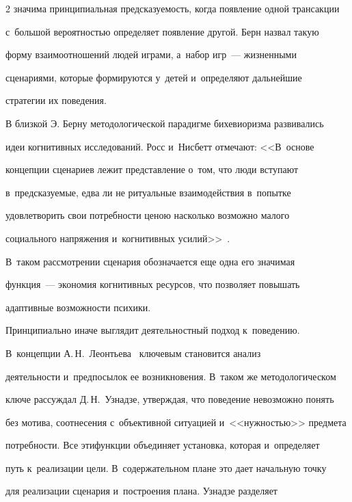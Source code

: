 \begin{multicols}{2}
значима принципиальная предсказуемость, когда появление одной трансакции 

с~большой вероятностью определяет появление другой. Берн назвал такую 

форму взаимоотношений людей играми, а~набор игр~--- жизненными 

сценариями, которые формируются у~детей и~определяют дальнейшие 

стратегии их поведения. 

  

  В близкой Э. Берну методологической парадигме бихевиоризма развивались 

идеи когнитивных исследований. Росс и~Нисбетт отмечают: <<В~основе 

концепции сценариев лежит представление о~том, что люди вступают 

в~пред\-ска\-зу\-емые, едва ли не ритуальные взаимодействия в~попытке 

удовлетворить свои по\-треб\-но\-сти ценою насколько воз\-мож\-но малого 

социального напряжения и~когнитивных усилий>>~\cite[с.~145]{5-sm}. 

В~таком рассмотрении сценария обозначается еще одна его значимая 

функция~--- экономия когнитивных ресурсов, что позволяет повышать 

адаптивные возможности пси\-хики.

{ %



}

  

  Принципиально иначе выглядит деятельностный подход к~поведению. 

В~концепции А.\,Н.~Ле\-онть\-ева~\cite{6-sm} ключевым становится анализ 

деятельности и~предпосылок ее возникновения. В~таком же методологическом 

ключе рассуждал Д.\,Н.~Узнадзе, утверждая, что поведение невозможно понять 

без мотива, соотнесения с~объективной ситуацией и~<<нуж\-ностью>> предмета 

потребности. Все эти\linebreak функции объединяет установка, которая и~определяет 

путь к~реализации цели. В~содержательном плане это дает начальную точку 

для реализации сценария и~построения плана. Узнадзе \mbox{разделяет} 


\end{multicols}
